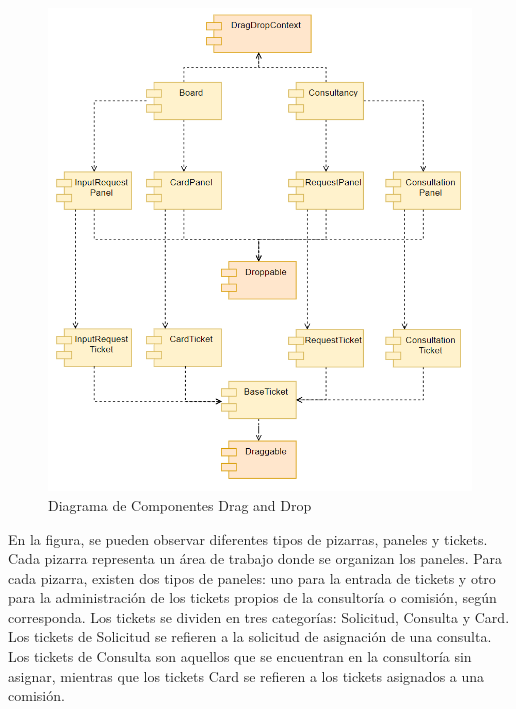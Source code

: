 \begin{figure}[H]
\centering
\includegraphics[width=0.90\linewidth]{fig/drag-drop-componentes.png}
\caption{Diagrama de Componentes Drag and Drop}
\label{fig:drag-drop-componentes}
\end{figure}

En la figura, se pueden observar diferentes tipos de pizarras, paneles y tickets. Cada pizarra representa un área de trabajo donde se organizan los paneles. Para cada pizarra, existen dos tipos de paneles: uno para la entrada de tickets y otro para la administración de los tickets propios de la consultoría o comisión, según corresponda. Los tickets se dividen en tres categorías: Solicitud, Consulta y Card. Los tickets de Solicitud se refieren a la solicitud de asignación de una consulta. Los tickets de Consulta son aquellos que se encuentran en la consultoría sin asignar, mientras que los tickets Card se refieren a los tickets asignados a una comisión.
